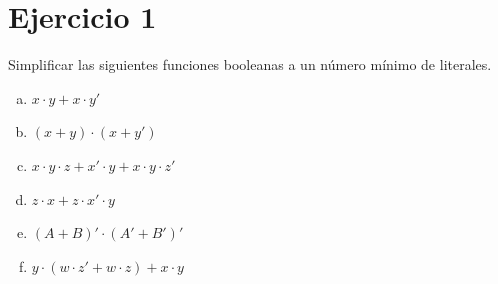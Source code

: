 \documentclass{article}
\begin{document}
\section*{Ejercicio 1}
Simplificar las siguientes funciones booleanas a un número mínimo de literales.
\begin{enumerate}[a)]
    \item $x \cdot y + x \cdot y'$
    \item $ ( x + y ) \cdot ( x + y')$
    \item $ x\cdot y \cdot z + x' \cdot y + x \cdot y \cdot z'$
    \item $z \cdot x + z \cdot x' \cdot y$
    \item $ (A+B)' \cdot (A' + B')'$
    \item $ y \cdot (w \cdot z' + w \cdot z) + x \cdot y $
\end{enumerate}
\end{document}
